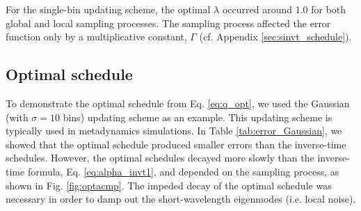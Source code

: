 \documentclass[reprint, floatfix]{revtex4-1}
\begin{document}
For the single-bin updating scheme,
the optimal $\lambda$ occurred around $1.0$
for both global and local sampling processes.
%
The sampling process affected the error function
only by a multiplicative constant, $\Gamma$
(cf. Appendix \ref{sec:sinvt_schedule}).
%




\subsection{\label{sec:results_optschedule}
Optimal schedule}



To demonstrate the optimal schedule from Eq. \eqref{eq:q_opt},
we used the Gaussian (with $\sigma = 10$ bins) updating scheme
as an example.
%
This updating scheme is typically used in metadynamics simulations.
%
In Table \ref{tab:error_Gaussian},
we showed that the optimal schedule
produced smaller errors than
the inverse-time schedules.
%
However, the optimal schedules
decayed more slowly than
the inverse-time formula, Eq. \eqref{eq:alpha_invt1},
and depended on the sampling process,
as shown in Fig. \ref{fig:optacmp}.
%
The impeded decay of the optimal schedule
was necessary in order to
damp out the short-wavelength eigenmodes
(i.e. local noise).
%
\end{document}
